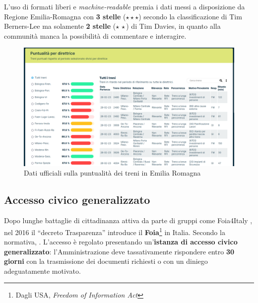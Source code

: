 \documentclass[12pt,a4paper,italian]{report}
\begin{document}
L'uso di formati liberi e \textit{machine-readable} premia i dati
messi a disposizione da Regione Emilia-Romagna con \textbf{3 stelle}
($\star \star \star$) secondo la classificazione di Tim Berners-Lee ma
solamente \textbf{2 stelle} ($\star\,\star$) di Tim Davies, in quanto
alla communità manca la possibilità di commentare e interagire.

\begin{figure}[h] \centering
    \includegraphics[width=1\textwidth]{images/fer_dati.png}
	\caption{Dati ufficiali sulla puntualità dei treni in Emilia
        Romagna \cite{FerDati}}
    \label{fer_dati}
\end{figure}


\subsection{Accesso civico generalizzato}
\label{foia}

Dopo lunghe battaglie di cittadinanza attiva da parte di gruppi come
Foia4Italy \cite{SilenziDiStato}, nel 2016 il ``decreto Trasparenza''
\cite{Dlgs97} introduce il \textbf{Foia}\footnote{Dagli USA,
    \textit{Freedom of Information Act}} in Italia.  Secondo la
normativa, .
L'accesso è regolato presentando un'\textbf{istanza di accesso civico
    generalizzato}: l'Amministrazione deve tassativamente rispondere
entro \textbf{30 giorni} con la trasmissione dei documenti richiesti o
con un diniego adeguatamente motivato.
\end{document}
